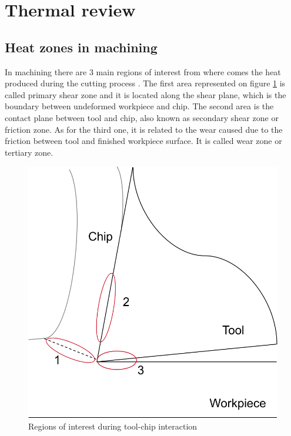 \section{Thermal review}

	\subsection{Heat zones in machining}
	\label{subsec:heatzones}

	In machining there are 3 main regions of interest from where comes the heat produced during the cutting process \cite{shaw2005metal}. The first area represented on figure \ref{fig:heatZones} is called primary shear zone and it is located along the shear plane, which is the boundary between undeformed workpiece and chip. The second area is the contact plane between tool and chip, also known as secondary shear zone or friction zone. As for the third one, it is related to the wear caused due to the friction between tool and finished workpiece surface. It is called wear zone or tertiary zone.

	\begin{figure}[h]
		\centering
		\captionsetup{justification=centering}
		\includegraphics[scale=0.5]{Imagens/heatZones.png}
		\caption{Regions of interest during tool-chip interaction}
		\label{fig:heatZones}
	\end{figure}

